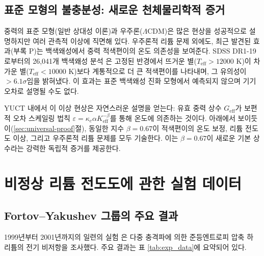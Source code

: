 \documentclass[11pt,a4paper]{article}
\newcommand{\Ke}{K_{\mathrm{eff}}}
\newcommand{\kappac}{\kappa_c}
\newcommand{\alp}{\alpha}
\theoremstyle{remark}
\begin{document}
	\subsection{표준 모형의 불충분성: 새로운 천체물리학적 증거}
	\label{subsec:std-inadequacy}
	
	중력의 표준 모형(일반 상대성 이론)과 우주론(\(\Lambda\)CDM)은 많은 현상을 성공적으로 설명하지만 여러 관측적 이상에 직면해 있다. 우주론적 리튬 문제 외에도, 최근 발견된 효과(부록 P)는 백색왜성에서 중력 적색편이의 온도 의존성을 보여준다. SDSS DR1-19로부터의 26,041개 백색왜성 분석 \cite{Crumpler2024}은 고정된 반경에서 뜨거운 별(\(T_{\mathrm{eff}} > 12000\) K)이 차가운 별(\(T_{\mathrm{eff}} < 10000\) K)보다 계통적으로 더 큰 적색편이를 나타내며, 그 유의성이 \(>6.1\sigma\)임을 밝혀냈다. 이 효과는 표준 백색왜성 진화 모형에서 예측되지 않으며 기기 오차로 설명될 수도 없다.
	
	YUCT 내에서 이 이상 현상은 자연스러운 설명을 얻는다: 유효 중력 상수 \(G_{\mathrm{eff}}\)가 보편적 오차 스케일링 법칙 \(\varepsilon = \kappac \alp \Ke^{-\beta}\)를 통해 온도에 의존하는 것이다. 아래에서 보이듯이(\ref{sec:universal-proof}절), 동일한 지수 \(\beta = 0.67\)이 적색편이의 온도 보정, 리튬 전도도 이상, 그리고 우주론적 리튬 문제를 모두 기술한다. 이는 \(\beta = 0.67\)이 새로운 기본 상수라는 강력한 독립적 증거를 제공한다.
	
	\section{비정상 리튬 전도도에 관한 실험 데이터}
	
	\subsection{Fortov–Yakushev 그룹의 주요 결과}
	
	1999년부터 2001년까지의 일련의 실험 \cite{fortov1999, fortov2001, yakushev2002}은 다중 충격파에 의한 준등엔트로피 압축 하 리튬의 전기 비저항을 조사했다. 주요 결과는 표 \ref{tab:exp_data}에 요약되어 있다.
	
\end{document}
